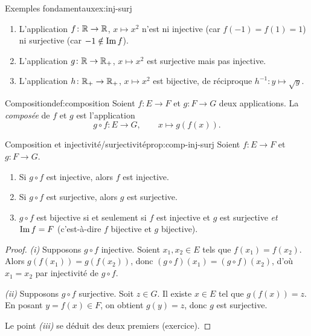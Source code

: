 \begin{example}{Exemples fondamentaux}{ex:inj-surj}
  \begin{enumerate}[label=(\alph*)]
    \item L'application $f\colon{\mathbb{R}}\to{\mathbb{R}}$, $x\mapsto x^2$ n'est ni
      injective (car $f(-1)=f(1)=1$) ni surjective (car $-1\notin\operatorname{Im} f$).
    \item L'application $g\colon{\mathbb{R}}\to{\mathbb{R}}_+$, $x\mapsto x^2$ est
      surjective mais pas injective.
    \item L'application $h\colon{\mathbb{R}}_+\to{\mathbb{R}}_+$, $x\mapsto x^2$ est bijective,
      de réciproque $h^{-1}\colon y\mapsto\sqrt{y}$.
  \end{enumerate}
\end{example}

\begin{definition}{Composition}{def:composition}
  Soient $f\colon E\to F$ et $g\colon F\to G$ deux applications.
  La \emph{composée} de $f$ et $g$ est l'application
  \[
    g\circ f\colon E\to G,\qquad x\mapsto g(f(x)).
  \]
\end{definition}

\begin{proposition}{Composition et injectivité/surjectivité}{prop:comp-inj-surj}
  Soient $f\colon E\to F$ et $g\colon F\to G$.
  \begin{enumerate}[label=(\roman*)]
    \item Si $g\circ f$ est injective, alors $f$ est injective.
    \item Si $g\circ f$ est surjective, alors $g$ est surjective.
    \item $g\circ f$ est bijective si et seulement si $f$ est injective
      et $g$ est surjective \emph{et} $\operatorname{Im} f = F$ (c'est-à-dire $f$ bijective
      et $g$ bijective).
  \end{enumerate}
\end{proposition}

\begin{proof}
  \emph{(i)} Supposons $g\circ f$ injective. Soient $x_1,x_2\in E$ tels
  que $f(x_1)=f(x_2)$. Alors $g(f(x_1))=g(f(x_2))$, donc
  $(g\circ f)(x_1)=(g\circ f)(x_2)$, d'où $x_1=x_2$ par injectivité de
  $g\circ f$.

  \emph{(ii)} Supposons $g\circ f$ surjective. Soit $z\in G$. Il existe
  $x\in E$ tel que $g(f(x))=z$. En posant $y=f(x)\in F$, on obtient
  $g(y)=z$, donc $g$ est surjective.

  Le point \emph{(iii)} se déduit des deux premiers (exercice).
\end{proof}

